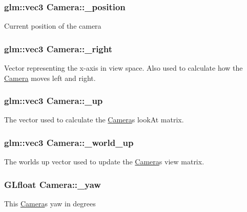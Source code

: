 \subsubsection[{\texorpdfstring{\+\_\+position}{_position}}]{\setlength{\rightskip}{0pt plus 5cm}glm\+::vec3 Camera\+::\+\_\+position}\hypertarget{classCamera_a0a931ed2051befaad1f482b3b5e98ca0}{}\label{classCamera_a0a931ed2051befaad1f482b3b5e98ca0}
Current position of the camera 
\subsubsection[{\texorpdfstring{\+\_\+right}{_right}}]{\setlength{\rightskip}{0pt plus 5cm}glm\+::vec3 Camera\+::\+\_\+right}\hypertarget{classCamera_a4c556280ed181d8589c28eec7ebebb49}{}\label{classCamera_a4c556280ed181d8589c28eec7ebebb49}
Vector representing the x-\/axis in view space. Also used to calculate how the \hyperlink{classCamera}{Camera} moves left and right. 
\subsubsection[{\texorpdfstring{\+\_\+up}{_up}}]{\setlength{\rightskip}{0pt plus 5cm}glm\+::vec3 Camera\+::\+\_\+up}\hypertarget{classCamera_a323a698e4c5773ee3ec380851b145e2d}{}\label{classCamera_a323a698e4c5773ee3ec380851b145e2d}
The vector used to calculate the \hyperlink{classCamera}{Camera}\textquotesingle{}s look\+At matrix. 
\subsubsection[{\texorpdfstring{\+\_\+world\+\_\+up}{_world_up}}]{\setlength{\rightskip}{0pt plus 5cm}glm\+::vec3 Camera\+::\+\_\+world\+\_\+up}\hypertarget{classCamera_aa5d721a01ba1cb41eafb02e39ea29e03}{}\label{classCamera_aa5d721a01ba1cb41eafb02e39ea29e03}
The world\textquotesingle{}s up vector used to update the \hyperlink{classCamera}{Camera}\textquotesingle{}s view matrix. 
\subsubsection[{\texorpdfstring{\+\_\+yaw}{_yaw}}]{\setlength{\rightskip}{0pt plus 5cm}G\+Lfloat Camera\+::\+\_\+yaw}\hypertarget{classCamera_ab815461cc043db1f5810c2f488641740}{}\label{classCamera_ab815461cc043db1f5810c2f488641740}
This \hyperlink{classCamera}{Camera}\textquotesingle{}s yaw in degrees 
